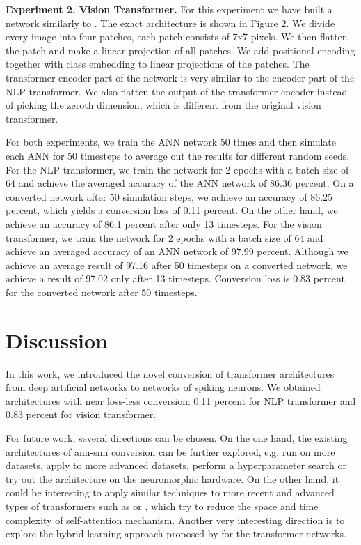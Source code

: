 \documentclass{article}
\begin{document}
\textbf{Experiment 2. Vision Transformer.} For this experiment we have built a network similarly to \cite{16x16words}. The exact architecture is shown in Figure 2. We divide every image into four patches, each patch consists of 7x7 pixels. We then flatten the patch and make a linear projection of all patches. We add positional encoding together with class embedding to linear projections of the patches. The transformer encoder part of the network is very similar to the encoder part of the NLP transformer. We also flatten the output of the transformer encoder instead of picking the zeroth dimension, which is different from the original vision transformer.

For both experiments, we train the ANN network 50 times and then simulate each ANN for 50 timesteps to average out the results for different random seeds. 
For the NLP transformer, we train the network for 2 epochs with a batch size of 64 and achieve the averaged accuracy of the ANN network of 86.36 percent. On a converted network after 50 simulation steps, we achieve an accuracy of 86.25 percent, which yields a conversion loss of 0.11 percent. On the other hand, we achieve an accuracy of 86.1 percent after only 13 timesteps.
For the vision transformer, we train the network for 2 epochs with a batch size of 64 and achieve an averaged accuracy of an ANN network of 97.99 percent. Although we achieve an average result of 97.16 after 50 timesteps on a converted network, we achieve a result of 97.02 only after 13 timesteps. Conversion loss is 0.83 percent for the converted network after 50 timesteps.


\section{Discussion}
In this work, we introduced the novel conversion of transformer architectures from deep artificial networks to networks of spiking neurons. We obtained architectures with near loss-less conversion: 0.11 percent for NLP transformer and 0.83 percent for vision transformer.

For future work, several directions can be chosen. On the one hand, the existing architectures of ann-snn conversion can be further explored, e.g. run on more datasets, apply to more advanced datasets, perform a hyperparameter search or try out the architecture on the neuromorphic hardware. On the other hand, it could be interesting to apply similar techniques to more recent and advanced types of transformers such as \cite{performer} or \cite{linformer}, which try to reduce the space and time complexity of self-attention mechanism. Another very interesting direction is to explore the hybrid learning approach proposed by \cite{hybrid_conversion} for the transformer networks.



\end{document}

